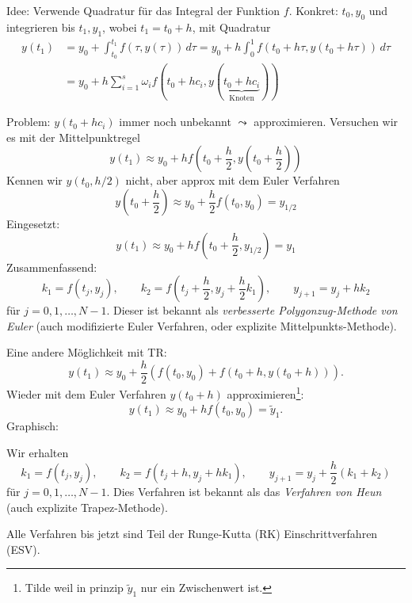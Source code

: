 \documentclass[a4paper]{article}
\begin{document}
Idee: Verwende Quadratur für das Integral der Funktion $f$. Konkret: $t_0,
y_0$ und integrieren bis $t_1, y_1$, wobei $t_1 = t_0 + h$, mit Quadratur
\begin{align*}
  y(t_1) &= y_0 + \int_{t_0}^{t_1} f(\tau, y(\tau)) \, d\tau
    = y_0 + h \int_0^1 f(t_0 + h\tau, y(t_0 + h\tau)) \, d\tau \\
  &= y_0 + h \sum_{i=1}^s \omega_i
    f(t_0 + h c_i, y(\underbrace{t_0 + h c_i}_\text{Knoten}))
\end{align*}

\begin{center}
  \skelfig
\end{center}

Problem: $y(t_0 + hc_i)$ immer noch unbekannt $\leadsto$ approximieren.
Versuchen wir es mit der Mittelpunktregel
\[
  y(t_1) \approx y_0 + h f \left(
    t_0 + \frac{h}{2}, y\left(t_0 + \frac{h}{2}\right)
  \right)
\]
Kennen wir $y(t_0, h/2)$ nicht, aber approx mit dem Euler Verfahren
\[
  y\left(t_0 + \frac{h}{2}\right) \approx
  y_0 + \frac{h}{2} f(t_0, y_0) = y_{1/2}
\]
Eingesetzt:
\[
  y(t_1) \approx y_0 + h f \left(
    t_0 + \frac{h}{2}, y_{1/2}
  \right) = y_1
\]
Zusammenfassend:
\[
  k_1 = f(t_j, y_j), \qquad
  k_2 = f\left(t_j + \frac{h}{2}, y_j + \frac{h}{2} k_1 \right), \qquad
  y_{j+1} = y_j + hk_2
\]
für $j = 0,1,\ldots,N-1$. Dieser ist bekannt als \emph{verbesserte
Polygonzug-Methode von Euler} (auch modifizierte Euler Verfahren, oder
explizite Mittelpunkts-Methode).

Eine andere Möglichkeit mit TR:
\[
  y(t_1) \approx y_0 + \frac{h}{2} \left(
    f(t_0, y_0) + f(t_0 + h, y(t_0 + h))
  \right).
\]
Wieder mit dem Euler Verfahren $y(t_0 + h)$ approximieren\footnote{Tilde weil
in prinzip $\tilde{y}_1$ nur ein Zwischenwert ist.}:
\[
  y(t_1) \approx y_0 + hf(t_0, y_0) = \tilde{y}_1.
\]
Graphisch:

\begin{center}
  \skelfig
\end{center}

Wir erhalten
\[
  k_1 = f(t_j, y_j), \qquad
  k_2 = f(t_j + h, y_j + h k_1), \qquad
  y_{j+1} = y_j + \frac{h}{2} (k_1 + k_2)
\]
für $j = 0,1,\ldots,N-1$. Dies Verfahren ist bekannt als das \emph{Verfahren
von Heun} (auch explizite Trapez-Methode).

Alle Verfahren bis jetzt sind Teil der Runge-Kutta (RK) Einschrittverfahren
(ESV).
\end{document}
